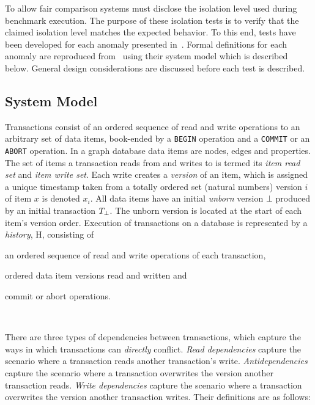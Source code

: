 To allow fair comparison systems must disclose the isolation level used
during benchmark execution. The purpose of these isolation tests is to verify 
that the claimed isolation level matches the expected behavior. To this end, 
tests have been developed for each anomaly presented 
in~\cite{DBLP:journals/tods/BailisFGHS16}. Formal definitions for each anomaly 
are reproduced from~\cite{adya1999weak,DBLP:journals/tods/BailisFGHS16} using 
their system model which is described below. General design considerations are 
discussed before each test is described.

\subsection{System Model}
\label{sec:system-model}

Transactions consist of an ordered sequence of read and write operations to an
arbitrary set of data items, book-ended by a \texttt{BEGIN} operation and a 
\texttt{COMMIT} or an \texttt{ABORT} operation. In a graph database data items 
are nodes, edges and properties. The set of items a transaction reads from and 
writes to is termed its \emph{item read set} and \emph{item write set}. Each 
write creates a \emph{version} of an item, which is assigned a unique timestamp
taken from a totally ordered set (\eg natural numbers) version $i$ of item $x$ 
is denoted $x_i$. All data items have an initial \emph{unborn} version $\bot$ 
produced by an initial transaction $T_{\bot}$. The unborn version is 
located at the start of each item's version order. Execution of transactions
on a database is represented by a \emph{history}, H, consisting of
\begin{enumerate*}[label={(\roman*)}]
  \item an ordered sequence of read and write operations of each transaction,
  \item ordered data item versions read and written and
  \item commit or abort operations.
\end{enumerate*}~\cite{DBLP:journals/tods/BailisFGHS16}

There are three types of dependencies between transactions, which capture the 
ways in which transactions can \emph{directly} conflict. \emph{Read dependencies} 
capture the scenario where a transaction reads another transaction's write. 
\emph{Antidependencies} capture the scenario where a transaction overwrites the 
version another transaction reads. \emph{Write dependencies} capture the 
scenario where a transaction overwrites the version another transaction writes. 
Their definitions are as follows:


